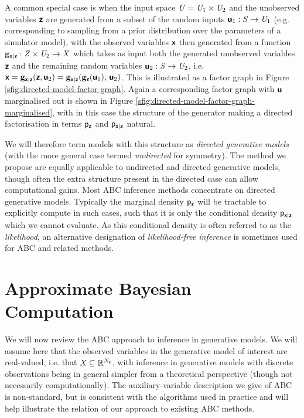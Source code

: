 A common special case is when the input space $\mathit{U} = \mathit{U}_1 \times \mathit{U}_2$ and the unobserved variables $\boldsymbol{\mathsf{z}}$ are generated from a subset of the random inputs $\boldsymbol{\mathsf{u}}_1 : \mathit{S} \to \mathit{U}_1$ (e.g. corresponding to sampling from a prior distribution over the parameters of a simulator model), with the observed variables $\boldsymbol{\mathsf{x}}$ then generated from a function ${\mathbf{g}}_{\boldsymbol{\mathsf{x}}|\boldsymbol{\mathsf{z}}} : \mathit{Z} \times \mathit{U}_2 \to \mathit{X}$ which takes as input both the generated unobserved variables $\boldsymbol{\mathsf{z}}$ and the remaining random variables $\boldsymbol{\mathsf{u}}_2 : \mathit{S} \to \mathit{U}_2$, i.e. $\rvct{x} = \genfunc_{\rvct{x}|\rvct{z}}(\rvct{z},\rvct{u}_2) = \genfunc_{\rvct{x}|\rvct{z}}\lpa\genfunc_{\rvct{z}}(\rvct{u}_1),\,\rvct{u}_2\rpa$. This is illustrated as a factor graph in Figure \ref{sfig:directed-model-factor-graph}. Again a corresponding factor graph with $\boldsymbol{\mathsf{u}}$ marginalised out is shown in Figure \ref{sfig:directed-model-factor-graph-marginalised}, with in this case the structure of the generator making a directed factorisation in terms $\mathsf{p}_{\boldsymbol{\mathsf{z}}}$ and $\mathsf{p}_{\boldsymbol{\mathsf{x}}|\boldsymbol{\mathsf{z}}}$ natural. 

We will therefore term models with this structure as \emph{directed generative models} (with the more general case termed \emph{undirected} for symmetry). 
The method we propose are equally applicable to undirected and directed generative models, though often the extra structure present in the directed case can allow computational gains. Most \ac{ABC} inference methods concentrate on directed generative models. Typically the marginal density $\mathsf{p}_{\boldsymbol{\mathsf{z}}}$ will be tractable to explicitly compute in such cases, such that it is only the conditional density $\mathsf{p}_{\boldsymbol{\mathsf{x}}|\boldsymbol{\mathsf{z}}}$ which we cannot evaluate. As this conditional density is often referred to as the \emph{likelihood}, an alternative designation of \emph{likelihood-free inference} is sometimes used for \ac{ABC} and related methods.
\enlargethispage{\baselineskip}


\section{Approximate Bayesian Computation}\label{sec:abc}

We will now review the \ac{ABC} approach to inference in generative models. We will assume here that the observed variables in the generative model of interest are real-valued, i.e. that $\mathit{X} \subseteq \mathbb{R}^{N_{\boldsymbol{\mathsf{x}}}}$, with inference in generative models with discrete observations being in general simpler from a theoretical perspective (though not necessarily computationally). The auxiliary-variable description we give of \ac{ABC} is non-standard, but is consistent with the algorithms used in practice and will help illustrate the relation of our approach to existing \ac{ABC} methods.


